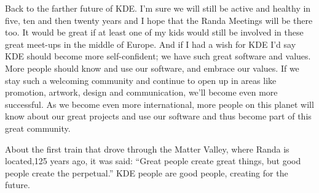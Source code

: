 Back to the farther future of KDE. I'm sure we will still be active and healthy in five, ten and then twenty years and I hope that the Randa Meetings will be there too. It would be great if at least one of my kids would still be involved in these great meet-ups in the middle of Europe. And if I had a wish for KDE I'd say KDE should become more self-confident; we have such great software and values. More people should know and use our software, and embrace our values. If we stay such a welcoming community and continue to open up in areas like promotion, artwork, design and communication, we'll become even more successful. As we become even more international, more people on this planet will know about our great projects and use our software and thus become part of this great community.

About the first train that drove through the Matter Valley, where Randa is located,125 years ago, it was said: “Great people create great things, but good people create the perpetual.” KDE people are good people, creating for the future.
